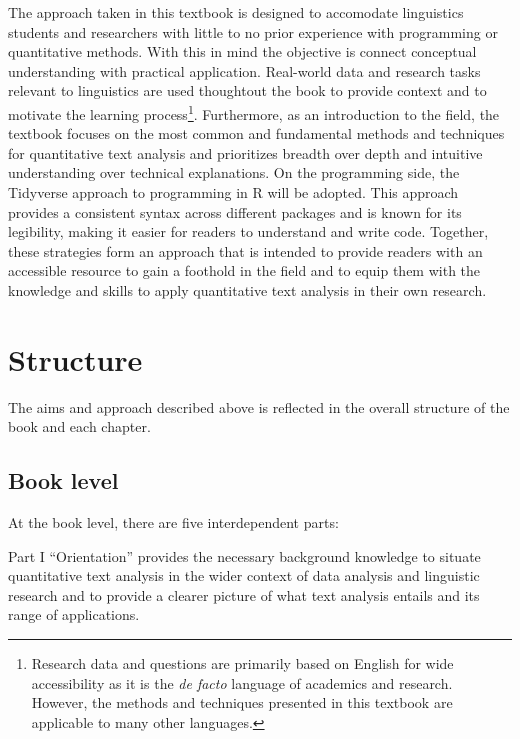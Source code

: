 \documentclass[
  letterpaper,
  DIV=11,
  numbers=noendperiod]{scrreport}
\theoremstyle{definition}
\theoremstyle{remark}
\begin{document}

The approach taken in this textbook is designed to accomodate
linguistics students and researchers with little to no prior experience
with programming or quantitative methods. With this in mind the
objective is connect conceptual understanding with practical
application. Real-world data and research tasks relevant to linguistics
are used thoughtout the book to provide context and to motivate the
learning process\footnote{Research data and questions are primarily
  based on English for wide accessibility as it is the \emph{de facto}
  language of academics and research. However, the methods and
  techniques presented in this textbook are applicable to many other
  languages.}. Furthermore, as an introduction to the field, the
textbook focuses on the most common and fundamental methods and
techniques for quantitative text analysis and prioritizes breadth over
depth and intuitive understanding over technical explanations. On the
programming side, the Tidyverse approach to programming in R will be
adopted. This approach provides a consistent syntax across different
packages and is known for its legibility, making it easier for readers
to understand and write code. Together, these strategies form an
approach that is intended to provide readers with an accessible resource
to gain a foothold in the field and to equip them with the knowledge and
skills to apply quantitative text analysis in their own research.

\hypertarget{sec-p-structure}{%
\section*{Structure}\label{sec-p-structure}}


The aims and approach described above is reflected in the overall
structure of the book and each chapter.

\hypertarget{sec-p-structure-book}{%
\subsection*{Book level}\label{sec-p-structure-book}}

At the book level, there are five interdependent parts:

Part I ``Orientation'' provides the necessary background knowledge to
situate quantitative text analysis in the wider context of data analysis
and linguistic research and to provide a clearer picture of what text
analysis entails and its range of applications.
\end{document}
